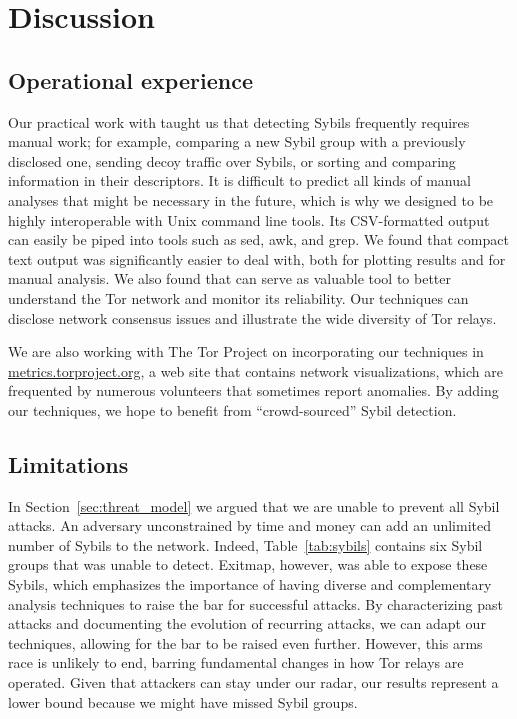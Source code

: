 \section{Discussion}
\label{sec:discussion}

\subsection{Operational experience}
\label{sec:operational}
Our practical work with \sys taught us that detecting Sybils frequently requires
manual work; for example, comparing a new Sybil group with a previously
disclosed one, sending decoy traffic over Sybils, or sorting and comparing
information in their descriptors.  It is difficult to predict all kinds of
manual analyses that might be necessary in the future, which is why we designed
\sys to be highly interoperable with Unix command line tools.  Its CSV-formatted
output can easily be piped into tools such as sed, awk, and grep.  We found that
compact text output was significantly easier to deal with, both for plotting
results and for manual analysis.  We also found that \sys can serve as valuable
tool to better understand the Tor network and monitor its reliability.  Our
techniques can disclose network consensus issues and illustrate the wide
diversity of Tor relays.

We are also working with The Tor Project on incorporating our techniques in
\url{metrics.torproject.org}, a web site that contains network visualizations,
which are frequented by numerous volunteers that sometimes report anomalies.
By adding our techniques, we hope to benefit from ``crowd-sourced'' Sybil
detection.

\subsection{Limitations}
\label{sec:limitations}
In Section~\ref{sec:threat_model} we argued that we are unable to prevent all
Sybil attacks.  An adversary unconstrained by time and money can add an
unlimited number of Sybils to the network.  Indeed, Table~\ref{tab:sybils}
contains six Sybil groups that \sys was unable to detect.  Exitmap, however, was
able to expose these Sybils, which emphasizes the importance of having diverse
and complementary analysis techniques to raise the bar for successful attacks.
By characterizing past attacks and documenting the evolution of recurring
attacks, we can adapt our techniques, allowing for the bar to be raised even
further.  However, this arms race is unlikely to end, barring fundamental
changes in how Tor relays are operated.  Given that attackers can stay under our
radar, our results represent a lower bound because we might have missed Sybil
groups.

